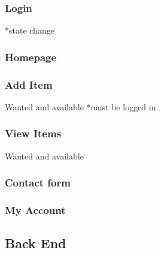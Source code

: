 \subsubsection{Login}

*state change



\subsubsection{Homepage}


\subsubsection{Add Item}
Wanted and available
*must be logged in

\subsubsection{View Items}
Wanted and available


\subsubsection{Contact form}


\subsubsection{My Account}





\subsection{Back End}
